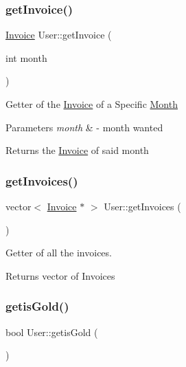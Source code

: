 \subsubsection{\texorpdfstring{get\+Invoice()}{getInvoice()}}
{\footnotesize\ttfamily \mbox{\hyperlink{class_invoice}{Invoice}} User\+::get\+Invoice (\begin{DoxyParamCaption}\item[{int}]{month }\end{DoxyParamCaption})}

Getter of the \mbox{\hyperlink{class_invoice}{Invoice}} of a Specific \mbox{\hyperlink{class_month}{Month}} 
\begin{DoxyParams}{Parameters}
{\em month} & -\/ month wanted \\
\hline
\end{DoxyParams}
\begin{DoxyReturn}{Returns}
the \mbox{\hyperlink{class_invoice}{Invoice}} of said month 
\end{DoxyReturn}
\mbox{\label{class_user_aeb297e5cd248e1e2c0ae3540cbedcca8}} 
\subsubsection{\texorpdfstring{get\+Invoices()}{getInvoices()}}
{\footnotesize\ttfamily vector$<$ \mbox{\hyperlink{class_invoice}{Invoice}} $\ast$ $>$ User\+::get\+Invoices (\begin{DoxyParamCaption}{ }\end{DoxyParamCaption})}



Getter of all the invoices. 

\begin{DoxyReturn}{Returns}
vector of Invoices 
\end{DoxyReturn}
\mbox{\label{class_user_ac1af1ded379bd2fd56f96f90348520fe}} 
\subsubsection{\texorpdfstring{getis\+Gold()}{getisGold()}}
{\footnotesize\ttfamily bool User\+::getis\+Gold (\begin{DoxyParamCaption}{ }\end{DoxyParamCaption})}

